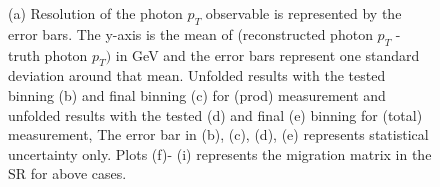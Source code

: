 \begin{figure}[ht]
    \hfill
    \hfill
    \hfill
    \hfill

    \caption{(a) Resolution of the photon $p_T$ observable is represented by the
    error bars. The y-axis is the mean of (reconstructed photon $p_T$ - truth
    photon $p_T)$ in GeV and the error bars represent one standard deviation
    around that mean. Unfolded results with the tested binning (b) and final
    binning (c) for \tty(prod) measurement and unfolded results with the tested
    (d) and final (e) binning for \tty(total) measurement, The error bar in (b),
    (c), (d), (e) represents statistical uncertainty only. Plots (f)- (i)
    represents the migration matrix in the SR for above cases.}
\end{figure}
\FloatBarrier

